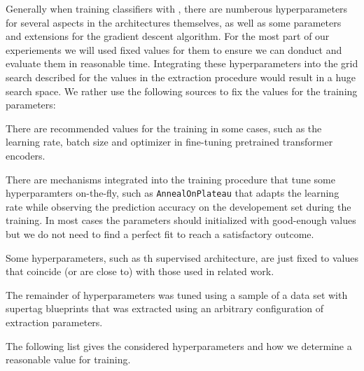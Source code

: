 \documentclass[../../document.tex]{subfiles}
\begin{document}
    Generally when training classifiers with , there are numberous hyperparameters for several aspects in the architectures themselves, as well as some parameters and extensions for the gradient descent algorithm.
    For the most part of our experiements we will used fixed values for them to ensure we can donduct and evaluate them in reasonable time.
    Integrating these hyperparameters into the grid search described for the values in the extraction procedure would result in a huge search space.
    We rather use the following sources to fix the values for the training parameters:
    \begin{compactitem}
        \item There are recommended values for the training in some cases, such as the learning rate, batch size and optimizer in fine-tuning pretrained transformer encoders. \citep{Devlin2019}
        \item There are mechanisms integrated into the training procedure that tune some hyperparamters on-the-fly, such as \texttt{AnnealOnPlateau} that adapts the learning rate while observing the prediction accuracy on the developement set during the training. In most cases the parameters should initialized with good-enough values but we do not need to find a perfect fit to reach a satisfactory outcome.
        \item Some hyperparameters, such as th supervised architecture, are just fixed to values that coincide (or are close to) with those used in related work.
        \item The remainder of hyperparameters was tuned using a sample of a data set with supertag blueprints that was extracted using an arbitrary configuration of extraction parameters.
    \end{compactitem}
    The following list gives the considered hyperparameters and how we determine a reasonable value for training.
\end{document}
